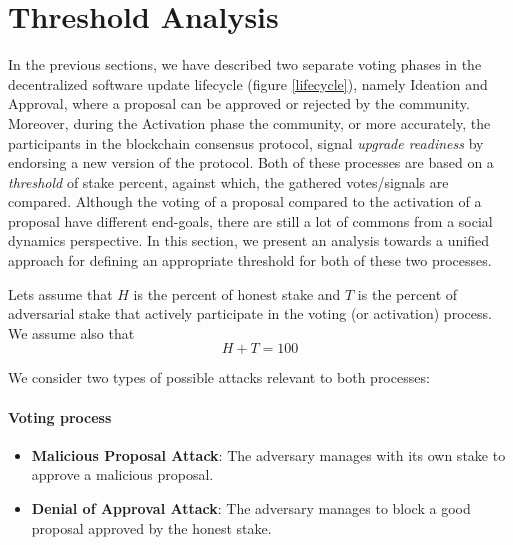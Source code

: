 \section{Threshold Analysis}\label{sec:threshold_analysis}

In the previous sections, we have described two separate voting phases in the 
decentralized software update lifecycle (figure \ref{lifecycle}), namely 
Ideation and Approval, where a proposal can be approved or rejected by the 
community. Moreover, during the Activation phase the community, or more 
accurately, the participants in the blockchain consensus protocol, signal 
\emph{upgrade readiness} by endorsing a new version of the protocol. Both of 
these processes are based on a \emph{threshold} of stake percent, against 
which, 
the gathered votes/signals are compared. Although the voting of a proposal 
compared to the activation of a proposal have different end-goals, there 
are still a lot of commons from a social dynamics perspective. In this section, 
we present an analysis towards a unified approach for defining an appropriate 
threshold for both of these two processes.

Lets assume that $H$ is the percent of honest stake and $T$ is the percent of 
adversarial stake that actively participate in the voting (or activation) 
process. We assume 
also that
\begin{equation}\label{eq:H_plus_T}
	H+T=100    
\end{equation}

We consider two types of possible attacks relevant to both processes:
\paragraph{Voting process}
\begin{itemize}
	\item \textbf{Malicious Proposal Attack}: The 
	adversary manages with its own stake to approve a malicious proposal.
	\item \textbf{Denial of Approval Attack}: The adversary manages to block a 
	good 
	proposal approved by the honest stake.
\end{itemize}

